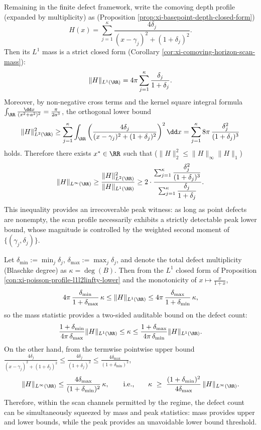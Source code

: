 \begin{proposition}\label{con:xi-poisson-profile-l1l2linfty-lower}
Remaining in the finite defect framework, write the comoving depth profile (expanded by multiplicity) as (Proposition \ref{prop:xi-basepoint-depth-closed-form})
\[
H(x)=\sum_{j=1}^{\kappa}\frac{4\delta_j}{(x-\gamma_j)^2+(1+\delta_j)^2}.
\]
Then its \(L^1\) mass is a strict closed form (Corollary \ref{cor:xi-comoving-horizon-scan-mass}):
\[
\|H\|_{L^1(\RR)}=4\pi\sum_{j=1}^{\kappa}\frac{\delta_j}{1+\delta_j}.
\]
Moreover, by non-negative cross terms and the kernel square integral formula
\(
\int_{\RR}\frac{\dd x}{(x^2+a^2)^2}=\frac{\pi}{2a^3}
\),
the orthogonal lower bound
\[
\|H\|_{L^2(\RR)}^2
\ge
\sum_{j=1}^{\kappa}
\int_{\RR}\left(\frac{4\delta_j}{(x-\gamma_j)^2+(1+\delta_j)^2}\right)^2\dd x
=
\sum_{j=1}^{\kappa}8\pi\,\frac{\delta_j^2}{(1+\delta_j)^3}
\]
holds. Therefore there exists \(x^{\ast}\in\RR\) such that (\(\|H\|_2^2\le \|H\|_\infty\|H\|_1\))
\[
\|H\|_{L^\infty(\RR)}
\ge
\frac{\|H\|_{L^2(\RR)}^2}{\|H\|_{L^1(\RR)}}
\ge
2\cdot
\frac{\sum_{j=1}^{\kappa}\dfrac{\delta_j^2}{(1+\delta_j)^3}}
{\sum_{j=1}^{\kappa}\dfrac{\delta_j}{1+\delta_j}}.
\]
This inequality provides an irrecoverable peak witness: as long as point defects are nonempty, the scan profile necessarily exhibits a strictly detectable peak lower bound, whose magnitude is controlled by the weighted second moment of \(\{(\gamma_j,\delta_j)\}\).
\end{proposition}

\begin{proposition}\label{con:xi-defect-count-mass-peak-sandwich}
Let \(\delta_{\min}:=\min_j\delta_j\), \(\delta_{\max}:=\max_j\delta_j\), and denote the total defect multiplicity (Blaschke degree) as \(\kappa=\deg(B)\).
Then from the \(L^1\) closed form of Proposition \ref{con:xi-poisson-profile-l1l2linfty-lower} and the monotonicity of \(x\mapsto \frac{x}{1+x}\),
\[
4\pi\,\frac{\delta_{\min}}{1+\delta_{\max}}\,\kappa
\le
\|H\|_{L^1(\RR)}
\le
4\pi\,\frac{\delta_{\max}}{1+\delta_{\min}}\,\kappa,
\]
so the mass statistic provides a two-sided auditable bound on the defect count:
\[
\frac{1+\delta_{\min}}{4\pi\,\delta_{\max}}\|H\|_{L^1(\RR)}
\le
\kappa
\le
\frac{1+\delta_{\max}}{4\pi\,\delta_{\min}}\|H\|_{L^1(\RR)}.
\]
On the other hand, from the termwise pointwise upper bound
\(
\frac{4\delta_j}{(x-\gamma_j)^2+(1+\delta_j)^2}\le \frac{4\delta_j}{(1+\delta_j)^2}
\le \frac{4\delta_{\max}}{(1+\delta_{\min})^2}
\),
\[
\|H\|_{L^\infty(\RR)}
\le
\frac{4\delta_{\max}}{(1+\delta_{\min})^2}\,\kappa,
\qquad\text{i.e.,}\qquad
\kappa\ \ge\ \frac{(1+\delta_{\min})^2}{4\delta_{\max}}\,\|H\|_{L^\infty(\RR)}.
\]
Therefore, within the scan channels permitted by the regime, the defect count can be simultaneously squeezed by mass and peak statistics: mass provides upper and lower bounds, while the peak provides an unavoidable lower bound threshold.
\end{proposition}

